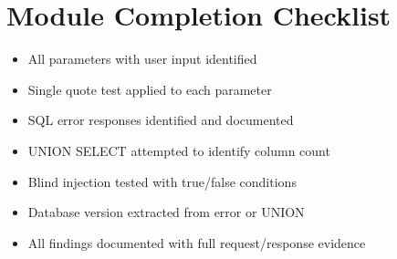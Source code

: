 \section{Module Completion Checklist}

\begin{tcolorbox}[findingstyle, title={Level 04 Burp Checklist}]
\begin{itemize}
  \item[\checkbox] All parameters with user input identified
  \item[\checkbox] Single quote test applied to each parameter
  \item[\checkbox] SQL error responses identified and documented
  \item[\checkbox] UNION SELECT attempted to identify column count
  \item[\checkbox] Blind injection tested with true/false conditions
  \item[\checkbox] Database version extracted from error or UNION
  \item[\checkbox] All findings documented with full request/response evidence
\end{itemize}
\end{tcolorbox}
